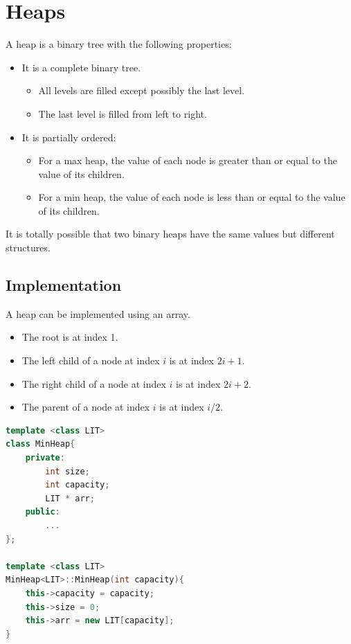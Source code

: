 \documentclass[letterpaper,12pt]{article}
\begin{document}
\section{Heaps}
A heap is a binary tree with the following properties:\begin{itemize}
    \item It is a complete binary tree.\begin{itemize}
        \item All levels are filled except possibly the last level.
        \item The last level is filled from left to right.
    \end{itemize}
    \item It is partially ordered:\begin{itemize}
        \item For a max heap, the value of each node is greater than or equal to the value of its children.
        \item For a min heap, the value of each node is less than or equal to the value of its children.
    \end{itemize}
\end{itemize}
It is totally possible that two binary heaps have the same values but different structures.
\subsection{Implementation}
A heap can be implemented using an array. \begin{itemize}
    \item The root is at index 1.
    \item The left child of a node at index $i$ is at index $2i+1$.
    \item The right child of a node at index $i$ is at index $2i+2$.
    \item The parent of a node at index $i$ is at index $i/2$.
\end{itemize}
\begin{lstlisting}[language=C++]
template <class LIT>
class MinHeap{
    private:
        int size;
        int capacity;
        LIT * arr;
    public:
        ...
};

template <class LIT>
MinHeap<LIT>::MinHeap(int capacity){
    this->capacity = capacity;
    this->size = 0;
    this->arr = new LIT[capacity];
}
\end{lstlisting}
\end{document}
